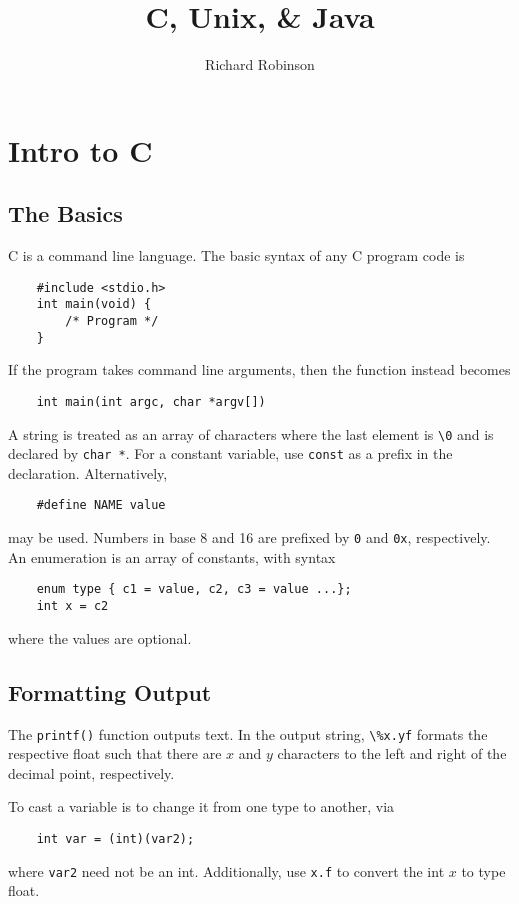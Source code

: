 \documentclass{tufte-book}
\title{C, Unix, \& Java}
\author{Richard Robinson}
\newcommand\BackgroundPic{%
\put(0,0){%
\parbox[b][\paperheight]{\paperwidth}{%
\vfill
\centering
\texttt{[image: keyboard]}%
\vfill
}}}
\begin{document}
\AddToShipoutPicture*{\BackgroundPic}
\frontmatter
\maketitle
\setlength{\parindent}{0pt}
\mainmatter

\chapter{Intro to C}

\section{The Basics}

C is a command line language. The basic syntax of any C program code is
\begin{lstlisting}
    #include <stdio.h>
    int main(void) {
        /* Program */
    }
\end{lstlisting}
If the program takes command line arguments, then the function instead becomes
\begin{lstlisting}
    int main(int argc, char *argv[])
\end{lstlisting}
A string is treated as an array of characters where the last element is \lstinline{\0} and is declared by \lstinline{char *}. For a constant variable, use \lstinline{const} as a prefix in the declaration. Alternatively,
\begin{lstlisting}
    #define NAME value
\end{lstlisting}
may be used. Numbers in base 8 and 16 are prefixed by \lstinline{0} and \lstinline{0x}, respectively. An enumeration is an array of constants, with syntax
\begin{lstlisting}
    enum type { c1 = value, c2, c3 = value ...};
    int x = c2
\end{lstlisting}
where the values are optional.

\section{Formatting Output}
The \lstinline{printf()} function outputs text.
In the output string, \lstinline{\%x.yf} formats the respective float such that there are $x$ and $y$ characters to the left and right of the decimal point, respectively.

\bigskip
To cast a variable is to change it from one type to another, via
\begin{lstlisting}
    int var = (int)(var2);
\end{lstlisting}
where \lstinline{var2} need not be an int. Additionally, use \lstinline{x.f} to convert the int $x$ to type float.
\end{document}
